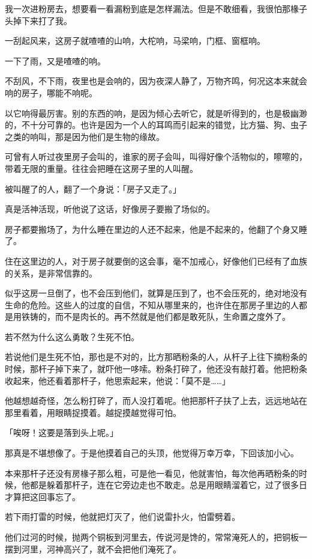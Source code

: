 \documentclass[UTF8]{ctexart}
\begin{document}
我一次进粉房去，想要看一看漏粉到底是怎样漏法。但是不敢细看，我很怕那椽子头掉下来打了我。

一刮起风来，这房子就喳喳的山响，大柁响，马梁响，门框、窗框响。

一下了雨，又是喳喳的响。

不刮风，不下雨，夜里也是会响的，因为夜深人静了，万物齐鸣，何况这本来就会响的房子，哪能不响呢。

以它响得最厉害。别的东西的响，是因为倾心去听它，就是听得到的，也是极幽渺的，不十分可靠的。也许是因为一个人的耳鸣而引起来的错觉，比方猫、狗、虫子之类的响叫，那是因为他们是生物的缘故。

可曾有人听过夜里房子会叫的，谁家的房子会叫，叫得好像个活物似的，嚓嚓的，带着无限的重量。往往会把睡在这房子里的人叫醒。

被叫醒了的人，翻了一个身说：「房子又走了。」

真是活神活现，听他说了这话，好像房子要搬了场似的。

房子都要搬场了，为什么睡在里边的人还不起来，他是不起来的，他翻了个身又睡了。

住在这里边的人，对于房子就要倒的这会事，毫不加戒心，好像他们已经有了血族的关系，是非常信靠的。

似乎这房一旦倒了，也不会压到他们，就算是压到了，也不会压死的，绝对地没有生命的危险。这些人的过度的自信，不知从哪里来的，也许住在那房子里边的人都是用铁铸的，而不是肉长的。再不然就是他们都是敢死队，生命置之度外了。

若不然为什么这么勇敢？生死不怕。

若说他们是生死不怕，那也是不对的，比方那晒粉条的人，从杆子上往下摘粉条的时候，那杆子掉下来了，就吓他一哆嗦。粉条打碎了，他还没有敲打着。他把粉条收起来，他还看着那杆子，他思索起来，他说：「莫不是……」

他越想越奇怪，怎么粉打碎了，而人没打着呢。他把那杆子扶了上去，远远地站在那里看着，用眼睛捉摸着。越捉摸越觉得可怕。

「唉呀！这要是落到头上呢。」

那真是不堪想像了。于是他摸着自己的头顶，他觉得万幸万幸，下回该加小心。

本来那杆子还没有房椽子那么粗，可是他一看见，他就害怕，每次他再晒粉条的时候，他都是躲着那杆子，连在它旁边走也不敢走。总是用眼睛溜着它，过了很多日才算把这回事忘了。

若下雨打雷的时候，他就把灯灭了，他们说雷扑火，怕雷劈着。

他们过河的时候，抛两个铜板到河里去，传说河是馋的，常常淹死人的，把铜板一摆到河里，河神高兴了，就不会把他们淹死了。
\end{document}
